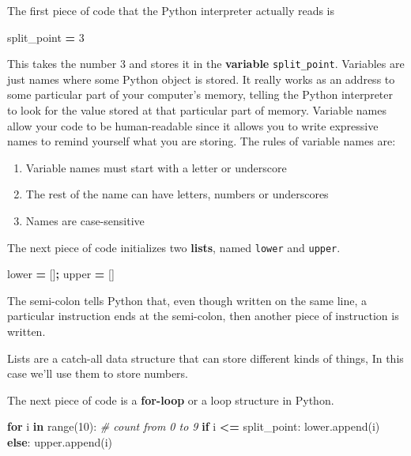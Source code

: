 \documentclass[
  letterpaper,
]{scrbook}
\newenvironment{Shaded}{\begin{snugshade}}{\end{snugshade}}
\newcommand{\BuiltInTok}[1]{#1}
\newcommand{\CommentTok}[1]{\textcolor[rgb]{0.56,0.35,0.01}{\textit{#1}}}
\newcommand{\ControlFlowTok}[1]{\textcolor[rgb]{0.13,0.29,0.53}{\textbf{#1}}}
\newcommand{\DecValTok}[1]{\textcolor[rgb]{0.00,0.00,0.81}{#1}}
\newcommand{\KeywordTok}[1]{\textcolor[rgb]{0.13,0.29,0.53}{\textbf{#1}}}
\newcommand{\NormalTok}[1]{#1}
\newcommand{\OperatorTok}[1]{\textcolor[rgb]{0.81,0.36,0.00}{\textbf{#1}}}
\providecommand{\tightlist}{%
  \setlength{\itemsep}{0pt}\setlength{\parskip}{0pt}}
\begin{document}
The first piece of code that the Python interpreter actually reads is

\begin{Shaded}
\begin{Highlighting}[]
\NormalTok{split_point }\OperatorTok{=} \DecValTok{3}
\end{Highlighting}
\end{Shaded}

This takes the number 3 and stores it in the \textbf{variable} \texttt{split\_point}. Variables are just names where some Python object is stored. It really works as an address to some particular part of your computer's memory, telling the Python interpreter to look for the value stored at that particular part of memory. Variable names allow your code to be human-readable since it allows you to write expressive names to remind yourself what you are storing. The rules of variable names are:

\begin{enumerate}
\def\labelenumi{\arabic{enumi}.}
\tightlist
\item
  Variable names must start with a letter or underscore
\item
  The rest of the name can have letters, numbers or underscores
\item
  Names are case-sensitive
\end{enumerate}

The next piece of code initializes two \textbf{lists}, named \texttt{lower} and \texttt{upper}.

\begin{Shaded}
\begin{Highlighting}[]
\NormalTok{lower }\OperatorTok{=}\NormalTok{ []}\OperatorTok{;}\NormalTok{ upper }\OperatorTok{=}\NormalTok{ []}
\end{Highlighting}
\end{Shaded}

The semi-colon tells Python that, even though written on the same line, a particular instruction ends at the semi-colon, then another piece of instruction is written.

Lists are a catch-all data structure that can store different kinds of things, In this case we'll use them to store numbers.

The next piece of code is a \textbf{for-loop} or a loop structure in Python.

\begin{Shaded}
\begin{Highlighting}[]
\ControlFlowTok{for}\NormalTok{ i }\KeywordTok{in} \BuiltInTok{range}\NormalTok{(}\DecValTok{10}\NormalTok{):  }\CommentTok{# count from 0 to 9}
    \ControlFlowTok{if}\NormalTok{ i }\OperatorTok{<=}\NormalTok{ split_point:}
\NormalTok{        lower.append(i)}
    \ControlFlowTok{else}\NormalTok{:}
\NormalTok{        upper.append(i)}
\end{Highlighting}
\end{Shaded}
\end{document}
